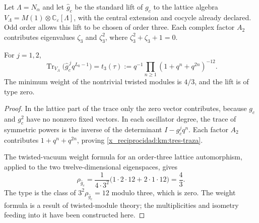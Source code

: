 Let \(\Lambda=N_\alpha\) and let \(\widehat g_c\) be the standard lift
of \(g_c\) to the lattice algebra
\(V_\Lambda=M(1)\otimes\mathbb C_\varepsilon[\Lambda]\), with the
central extension and cocycle already declared. Odd order allows
this lift to be chosen of order three. Each complex factor \(A_2\)
contributes eigenvalues \(\zeta_3\) and \(\zeta_3^2\), where
\(\zeta_3^2+\zeta_3+1=0\).

\begin{proposition}
\label{x_reciprocidad:km:traza-tipo}
For \(j=1,2\),
\begin{equation}
 \operatorname{Tr}_{V_\Lambda}
       \bigl(\widehat g_c^{\,j}q^{L_0-1}\bigr)
 =t_3(\tau)
 :=q^{-1}\prod_{n\ge1}(1+q^n+q^{2n})^{-12}.
 \label{x_reciprocidad:km:tres-traza}
\end{equation}
The minimum weight of the nontrivial twisted modules is \(4/3\), and
the lift is of type zero.
\end{proposition}
\begin{proof}
In the lattice part of the trace only the zero vector contributes,
because \(g_c\) and \(g_c^2\) have no nonzero fixed vectors.
In each oscillator degree, the trace of symmetric powers is the inverse
of the determinant \(I-g_c^jq^n\). Each factor \(A_2\) contributes
\(1+q^n+q^{2n}\), proving \eqref{x_reciprocidad:km:tres-traza}.

The twisted-vacuum weight formula for an order-three lattice
automorphism, applied to the two twelve-dimensional eigenspaces, gives
\[
 \rho_{\widehat g_c}
 =\frac{1}{4\cdot3^2}
   \bigl(1\cdot2\cdot12+2\cdot1\cdot12\bigr)=\frac43.
\]
The type is the class of \(3^2\rho_{\widehat g_c}=12\) modulo
three, which is zero. The weight formula is a result of twisted-module
theory; the multiplicities and isometry feeding into it
have been constructed here.
\end{proof}

